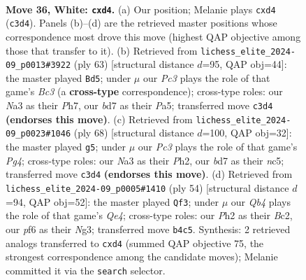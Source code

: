 \documentclass[11pt]{article}
\begin{document}
\clearpage

\begin{figure}[p]\centering
\begin{subfigure}{0.46\textwidth}\centering
\resizebox{\linewidth}{!}{%
\newchessgame
\chessboard[
  setfen={3qn2r/3b2k1/p4p2/n5pp/PQ1pP3/N1P5/B4PPP/R3K1N1 w - - 0 36},
  showmover=false,
  pgfstyle=straightmove, color=movearrow, markmove={c3-d4}
]}
\caption{}
\end{subfigure}\hfill
\begin{subfigure}{0.46\textwidth}\centering
\resizebox{\linewidth}{!}{%
\newchessgame
\chessboard[
  setfen={5r1k/2n3pp/2b2q2/p1P1N3/Pp3P2/1P1Q4/3B3P/4R1K1 b - - 2 32},
  showmover=false,
  pgfstyle=straightmove, color=movearrow, markmove={c6-d5}
]}
\caption{}
\end{subfigure}
\\[4pt]
\begin{subfigure}{0.46\textwidth}\centering
\resizebox{\linewidth}{!}{%
\newchessgame
\chessboard[
  setfen={5rk1/1b2q3/pp3n1Q/2n1pB2/2Pp2P1/1P6/6PP/5RK1 w - - 3 35},
  showmover=false,
  pgfstyle=straightmove, color=movearrow, markmove={g4-g5}
]}
\caption{}
\end{subfigure}\hfill
\begin{subfigure}{0.46\textwidth}\centering
\resizebox{\linewidth}{!}{%
\newchessgame
\chessboard[
  setfen={r5k1/3q1p2/p1p1bbpB/3n4/1p1PQ3/2P3N1/PPB2P2/4R1K1 w - - 0 28},
  showmover=false,
  pgfstyle=straightmove, color=movearrow, markmove={e4-f3}
]}
\caption{}
\end{subfigure}
\caption{\textbf{Move 36, White: \texttt{cxd4}.} (a) Our position; Melanie plays \texttt{cxd4} (\texttt{c3d4}). Panels (b)--(d) are the retrieved master positions whose correspondence most drove this move (highest QAP objective among those that transfer to it). (b) Retrieved from \texttt{lichess\_elite\_2024-09\_p0013\#3922} (ply 63) [structural distance $d$=95, QAP obj=44]: the master played \texttt{Bd5}; under $\mu$ our \emph{Pc3} plays the role of that game's \emph{Bc3} (a \textbf{cross-type} correspondence); cross-type roles: our \emph{N}a3 as their \emph{P}h7, our \emph{b}d7 as their \emph{P}a5; transferred move \texttt{c3d4} \textbf{(endorses this move)}. (c) Retrieved from \texttt{lichess\_elite\_2024-09\_p0023\#1046} (ply 68) [structural distance $d$=100, QAP obj=32]: the master played \texttt{g5}; under $\mu$ our \emph{Pc3} plays the role of that game's \emph{Pg4}; cross-type roles: our \emph{N}a3 as their \emph{P}h2, our \emph{b}d7 as their \emph{n}c5; transferred move \texttt{c3d4} \textbf{(endorses this move)}. (d) Retrieved from \texttt{lichess\_elite\_2024-09\_p0005\#1410} (ply 54) [structural distance $d$=94, QAP obj=52]: the master played \texttt{Qf3}; under $\mu$ our \emph{Qb4} plays the role of that game's \emph{Qe4}; cross-type roles: our \emph{P}h2 as their \emph{B}c2, our \emph{p}f6 as their \emph{N}g3; transferred move \texttt{b4c5}. Synthesis: 2 retrieved analogs transferred to \texttt{cxd4} (summed QAP objective 75, the strongest correspondence among the candidate moves); Melanie committed it via the \texttt{search} selector.}
\label{fig:thought-m70}
\end{figure}
\end{document}
